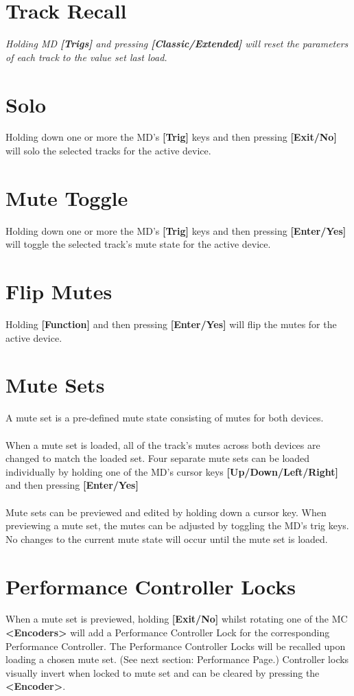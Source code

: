 \section{Track Recall}
\textit{Holding MD \textbf{[Trigs]} and pressing \textbf{[Classic/Extended]} will reset the parameters of each track to the value set last load.}
\section{Solo}
Holding down one or more the MD's \textbf{[Trig]} keys and then pressing \textbf{[Exit/No]} will solo the selected tracks for the active device.
\newpage
\section{Mute Toggle}
Holding down one or more the MD's \textbf{[Trig]} keys and then pressing \textbf{[Enter/Yes]} will toggle the selected track's mute state for the active device.
\section{Flip Mutes}
Holding \textbf{[Function]} and then pressing \textbf{[Enter/Yes]} will flip the mutes for the active device.
\section{Mute Sets}
A mute set is a pre-defined mute state consisting of mutes for both devices.\\\\  When a mute set is loaded, all of the track's mutes across both devices are changed to match the loaded set. Four separate mute sets can be loaded individually by holding one of the MD's cursor keys \textbf{[Up/Down/Left/Right]} and then pressing \textbf{[Enter/Yes]}\\\\
Mute sets can be previewed and edited by holding down a cursor key. When previewing a mute set, the mutes can be adjusted by toggling the MD's trig keys. No changes to the current mute state will occur until the mute set is loaded.
\section{Performance Controller Locks}
When a mute set is previewed, holding \textbf{[Exit/No]} whilst rotating one of the MC \textbf{<Encoders>} will add a Performance Controller Lock for the corresponding Performance Controller.  The Performance Controller Locks will be recalled upon loading a chosen mute set. (See next section: Performance Page.)   Controller locks visually invert when locked to mute set and can be cleared by pressing the\textbf{ <Encoder>}.
